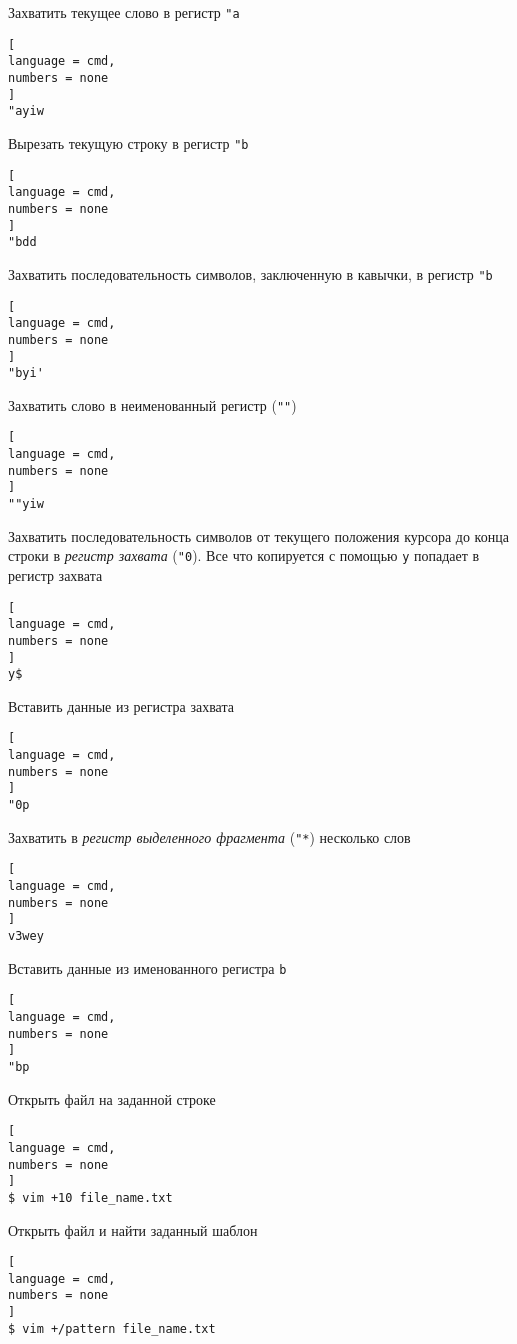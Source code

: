 \documentclass[%
	11pt,
	a4paper,
	utf8,
		]{article}
\begin{document}
Захватить текущее слово в регистр \texttt{"a}
\begin{lstlisting}[
language = cmd,
numbers = none
]
"ayiw
\end{lstlisting}

Вырезать текущую строку в регистр \texttt{"b}
\begin{lstlisting}[
language = cmd,
numbers = none
]
"bdd
\end{lstlisting}

Захватить последовательность символов, заключенную в кавычки, в регистр \texttt{"b}
\begin{lstlisting}[
language = cmd,
numbers = none
]
"byi'
\end{lstlisting}

Захватить слово в неименованный регистр (\verb|""|)
\begin{lstlisting}[
language = cmd,
numbers = none
]
""yiw
\end{lstlisting}

Захватить последовательность символов от текущего положения курсора до конца строки в \emph{регистр захвата} (\texttt{"0}). Все что копируется с помощью \texttt{y} попадает в регистр захвата
\begin{lstlisting}[
language = cmd,
numbers = none
]
y$
\end{lstlisting}

Вставить данные из регистра захвата
\begin{lstlisting}[
language = cmd,
numbers = none
]
"0p
\end{lstlisting}

Захватить в \emph{регистр выделенного фрагмента} (\texttt{"*}) несколько слов
\begin{lstlisting}[
language = cmd,
numbers = none
]
v3wey
\end{lstlisting}


Вставить данные из именованного регистра \texttt{b}
\begin{lstlisting}[
language = cmd,
numbers = none
]
"bp	
\end{lstlisting}

Открыть файл на заданной строке
\begin{lstlisting}[
language = cmd,
numbers = none
]
$ vim +10 file_name.txt
\end{lstlisting}

Открыть файл и найти заданный шаблон
\begin{lstlisting}[
language = cmd,
numbers = none
]
$ vim +/pattern file_name.txt
\end{lstlisting}
\end{document}
